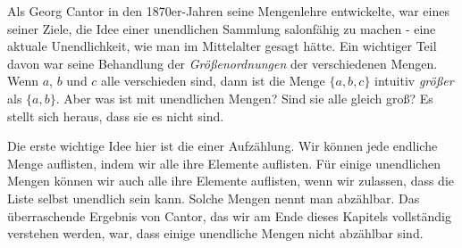 \documentclass[../../../include/open-logic-section]{subfiles}
\begin{document}


Als Georg Cantor in den 1870er-Jahren seine Mengenlehre entwickelte, war eines seiner Ziele, die Idee einer unendlichen Sammlung salonfähig zu machen - eine
aktuale Unendlichkeit, wie man im Mittelalter gesagt hätte.  Ein wichtiger Teil davon war seine
Behandlung der \emph{Größenordnungen} der verschiedenen Mengen. Wenn $a$, $b$ und $c$
alle verschieden sind, dann ist die Menge $\{a, b, c\}$ intuitiv \emph{größer}
als $\{a, b\}$. Aber was ist mit unendlichen Mengen? Sind sie alle gleich groß? Es stellt sich heraus, dass sie es nicht sind.

Die erste wichtige Idee hier ist die einer Aufzählung. Wir können
jede endliche Menge auflisten, indem wir alle ihre Elemente auflisten. Für einige
unendlichen Mengen können wir auch alle ihre Elemente auflisten, wenn wir zulassen, dass die
Liste selbst unendlich sein kann. Solche Mengen nennt man abzählbar.
Das überraschende Ergebnis von Cantor, das wir am Ende dieses Kapitels vollständig verstehen werden, war, dass einige unendliche Mengen nicht abzählbar sind.
\end{document}
